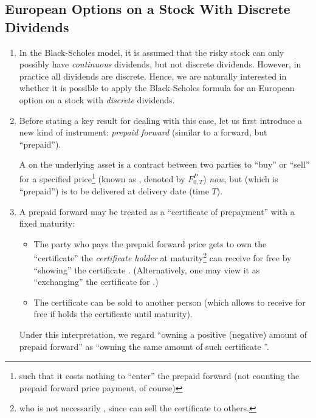 \subsection{European Options on a Stock With Discrete Dividends}
\begin{enumerate}
\item In the Black-Scholes model, it is assumed that the risky stock
 can only possibly have \emph{continuous} dividends, but not
discrete dividends. However, in practice all dividends are discrete. Hence, we
are naturally interested in whether it is possible to apply the Black-Scholes
formula for an European option on a stock with \emph{discrete} dividends.

\item Before stating a key result for dealing with this case, let us first
introduce a new kind of instrument: \emph{prepaid forward} (similar to a
forward, but ``prepaid'').

A  on the underlying asset  is a
contract between two parties to ``buy'' or ``sell''  for a
specified price\footnote{such that it costs nothing to ``enter'' the prepaid
forward (not counting the prepaid forward price payment, of course)} (known as
, denoted by \(F_{0,T}^P\)) \emph{now}, but
 (which is ``prepaid'') is to be delivered at delivery date
(time \(T\)).

\item A prepaid forward may be treated as a ``certificate of prepayment''
  with a fixed maturity:
\begin{itemize}
\item The party {\color{violet}} who pays the prepaid forward
price gets to own the ``certificate''   the
\emph{certificate holder} at maturity\footnote{who is not necessarily
{\color{violet}}, since {\color{violet}} can
sell the certificate  to others.} can receive 
for free by ``showing'' the certificate . (Alternatively, one may view it as
``exchanging'' the certificate  for .)
\item The certificate  can be sold to another person
 (which allows  to receive  for free if
 holds the certificate  until maturity).
\end{itemize}
Under this interpretation, we regard ``owning a positive (negative) amount of
prepaid forward'' as ``owning the same amount of such certificate
''.


\end{enumerate}
